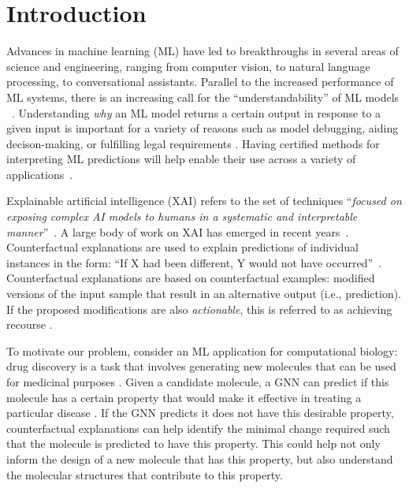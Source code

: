 
\section{Introduction}
\label{section:cfgnn-introduction}
Advances in machine learning (ML) have led to breakthroughs in several areas of science and engineering,  ranging from computer vision, to natural language processing, to conversational assistants. 
Parallel to the increased performance of ML systems, there is an increasing call for the ``understandability'' of ML models ~\citep{goebel-2018-explainable}. 
Understanding \emph{why} an ML model returns a certain output in response to a given input is important for a variety of reasons such as model debugging, aiding decison-making, or fulfilling legal requirements \citep{gdpr}. 
Having certified methods for interpreting ML predictions will help enable their use across a variety of applications~\citep{miller-2017-explanations}.



Explainable artificial intelligence (XAI) refers to the set of techniques ``\textit{focused on exposing complex AI models to humans in a systematic and interpretable manner}''~\citep{samekexplainable}. A large body of work on XAI has emerged in recent years~\citep{guidotti-2018-survey,bodria2021benchmarking}. Counterfactual explanations are used to explain predictions of individual instances in the form: ``If X had been different, Y would not have occurred''~\citep{stepin2021survey,karimi_model-agnostic_2019,schut_generating_2021}. 
Counterfactual explanations are based on counterfactual examples: modified versions of the input sample that result in an alternative output (i.e., prediction). 
If the proposed modifications are also \emph{actionable}, this is referred to as achieving recourse \citep{ustun_actionable_2019,karimi2020survey}. 

To motivate our problem, consider an ML application for computational biology: drug discovery is a task that involves generating new molecules that can be used for medicinal purposes \citep{stokes_deep_2020,xie2021mars}. 
Given a candidate molecule, a GNN can predict if this molecule has a certain property that would make it effective in treating a particular disease \citep{wieder_compact_2020,guo2021fewshot,nguyen2020metalearning}.
If the GNN predicts it does not have this desirable property, counterfactual explanations can help identify the minimal change required such that the molecule is predicted to have this property. 
This could help not only inform the design of a new molecule that has this property, but also understand the molecular structures that contribute to this property.


